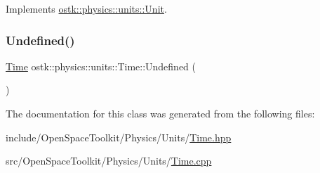 Implements \hyperlink{classostk_1_1physics_1_1units_1_1_unit_a8162b4eb8221c7577af16ab8b399d07e}{ostk\+::physics\+::units\+::\+Unit}.

\mbox{\label{classostk_1_1physics_1_1units_1_1_time_a441dc384583635132e8e068425114ca4}} 
\subsubsection{\texorpdfstring{Undefined()}{Undefined()}}
{\footnotesize\ttfamily \hyperlink{classostk_1_1physics_1_1units_1_1_time}{Time} ostk\+::physics\+::units\+::\+Time\+::\+Undefined (\begin{DoxyParamCaption}{ }\end{DoxyParamCaption})\hspace{0.3cm}{\ttfamily [static]}}



The documentation for this class was generated from the following files\+:\begin{DoxyCompactItemize}
\item 
include/\+Open\+Space\+Toolkit/\+Physics/\+Units/\hyperlink{_units_2_time_8hpp}{Time.\+hpp}\item 
src/\+Open\+Space\+Toolkit/\+Physics/\+Units/\hyperlink{_units_2_time_8cpp}{Time.\+cpp}\end{DoxyCompactItemize}
